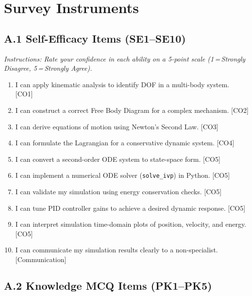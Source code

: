\documentclass[12pt, a4paper]{article}
\begin{document}



\appendix
\section{Survey Instruments}
\label{app:instruments}

\subsection*{A.1 Self-Efficacy Items (SE1--SE10)}

\textit{Instructions: Rate your confidence in each ability on a
5-point scale (1\,=\,Strongly Disagree, 5\,=\,Strongly Agree).}

\begin{enumerate}[label=SE\arabic*.]
  \item I can apply kinematic analysis to identify DOF in a
    multi-body system. [CO1]
  \item I can construct a correct Free Body Diagram for a complex
    mechanism. [CO2]
  \item I can derive equations of motion using Newton's Second
    Law. [CO3]
  \item I can formulate the Lagrangian for a conservative dynamic
    system. [CO4]
  \item I can convert a second-order ODE system to state-space
    form. [CO5]
  \item I can implement a numerical ODE solver
    (\texttt{solve\_ivp}) in Python. [CO5]
  \item I can validate my simulation using energy conservation
    checks. [CO5]
  \item I can tune PID controller gains to achieve a desired
    dynamic response. [CO5]
  \item I can interpret simulation time-domain plots of position,
    velocity, and energy. [CO5]
  \item I can communicate my simulation results clearly to a
    non-specialist. [Communication]
\end{enumerate}

\subsection*{A.2 Knowledge MCQ Items (PK1--PK5)}
\end{document}

